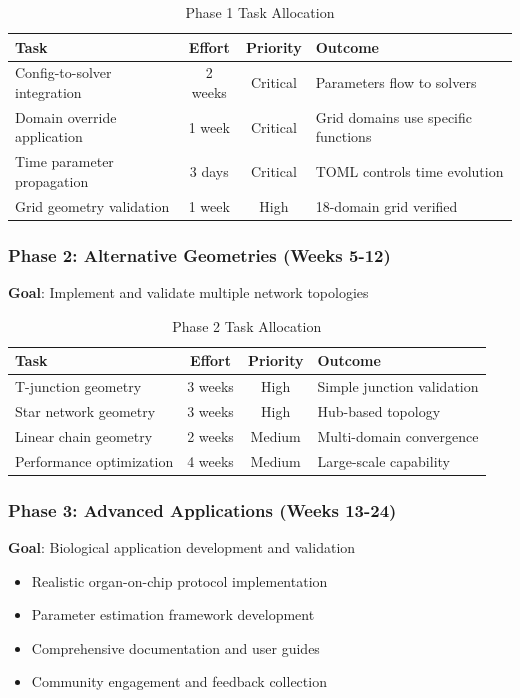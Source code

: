\begin{table}[h]
\centering
\begin{tabular}{|l|c|c|l|}
\hline
\textbf{Task} & \textbf{Effort} & \textbf{Priority} & \textbf{Outcome} \\
\hline
Config-to-solver integration & 2 weeks & Critical & Parameters flow to solvers \\
Domain override application & 1 week & Critical & Grid domains use specific functions \\
Time parameter propagation & 3 days & Critical & TOML controls time evolution \\
Grid geometry validation & 1 week & High & 18-domain grid verified \\
\hline
\end{tabular}
\caption{Phase 1 Task Allocation}
\end{table}

\subsubsection{Phase 2: Alternative Geometries (Weeks 5-12)}
\textbf{Goal}: Implement and validate multiple network topologies

\begin{table}[h]
\centering
\begin{tabular}{|l|c|c|l|}
\hline
\textbf{Task} & \textbf{Effort} & \textbf{Priority} & \textbf{Outcome} \\
\hline
T-junction geometry & 3 weeks & High & Simple junction validation \\
Star network geometry & 3 weeks & High & Hub-based topology \\
Linear chain geometry & 2 weeks & Medium & Multi-domain convergence \\
Performance optimization & 4 weeks & Medium & Large-scale capability \\
\hline
\end{tabular}
\caption{Phase 2 Task Allocation}
\end{table}

\subsubsection{Phase 3: Advanced Applications (Weeks 13-24)}
\textbf{Goal}: Biological application development and validation

\begin{itemize}
    \item Realistic organ-on-chip protocol implementation
    \item Parameter estimation framework development
    \item Comprehensive documentation and user guides
    \item Community engagement and feedback collection
\end{itemize}

